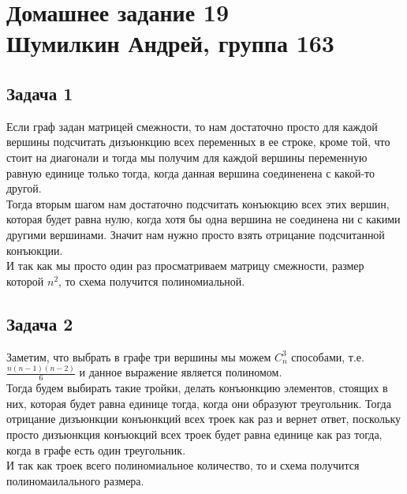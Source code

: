 

	\section{Домашнее задание 19\\ Шумилкин Андрей, группа 163} 
	\subsection{Задача 1}
	Если граф задан матрицей смежности, то нам достаточно просто для каждой вершины подсчитать дизъюнкцию всех переменных в ее строке, кроме той, что стоит на диагонали и тогда мы получим для каждой вершины переменную равную единице только тогда, когда данная вершина соединенена с какой-то другой. \\
	Тогда вторым шагом нам достаточно подсчитать конъюкцию всех этих вершин, которая будет равна нулю, когда хотя бы одна вершина не соединена ни с какими другими вершинами. Значит нам нужно просто взять отрицание подсчитанной конъюкции. \\
	И так как мы просто один раз просматриваем матрицу смежности, размер которой $n^2$, то схема получится полиномиальной. 
	
	\subsection{Задача 2}
	Заметим, что выбрать в графе три вершины мы можем $C_n^3$ способами, т.е. $\frac{n(n-1)(n-2)}{6}$ и данное выражение является полиномом. \\
	Тогда будем выбирать такие тройки, делать конъюнкцию элементов, стоящих в них, которая будет равна единице тогда, когда они образуют треугольник. Тогда отрицание дизъюнкции конъюнкций всех троек как раз и вернет ответ, поскольку просто дизъюнкция  конъюкций всех троек будет равна единице как раз тогда, когда в графе есть один треугольник. \\
	И так как троек всего полиномиальное количество, то и схема получится полиномаилального размера.
	
